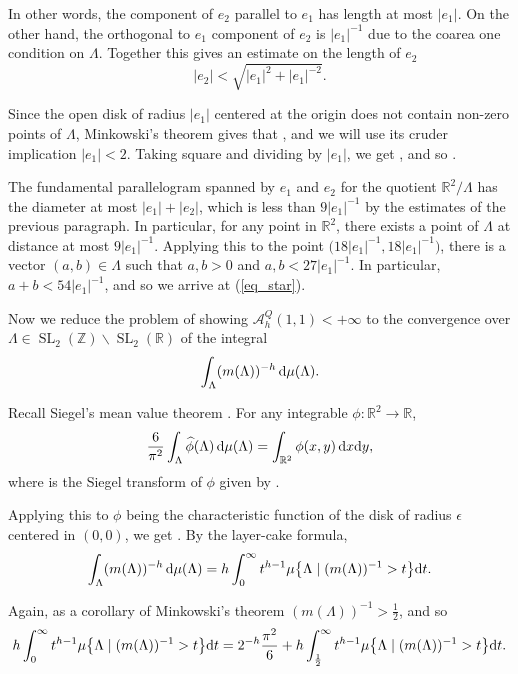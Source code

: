 \documentclass[10pt,a4paper]{amsart}
\numberwithin{equation}{section}
\theoremstyle{definition}
\begin{document}
In other words, the component of $e_2$ parallel to $e_1$ has length at most $|e_1|$. On the other hand, the orthogonal to $e_1$ component of $e_2$ is $|e_1|^{-1}$ due to the coarea one condition on $\Lambda$. Together this gives an estimate on the length of $e_2$
\[|e_2|<\sqrt{|e_1|^2+|e_1|^{-2}}.\]

Since the open disk of radius $|e_1|$ centered at the origin does not contain non-zero points of $\Lambda$, Minkowski's theorem \cite{minkowski} gives that , and we will use its cruder implication $|e_1|<2$. Taking square and dividing by $|e_1|$, we get , and so .

The fundamental parallelogram spanned by $e_1$ and $e_2$ for the quotient $\mathbb{R}^2\slash\Lambda$ has the diameter at most $|e_1|+|e_2|$, which is less than $9|e_1|^{-1}$ by the estimates of the previous paragraph. In particular, for any point in $\mathbb{R}^2$, there exists a point of $\Lambda$ at distance at most $9|e_1|^{-1}$. Applying this to the point $\bigl(18|e_1|^{-1},18|e_1|^{-1}\bigr)$, there is a vector $(a,b)\in\Lambda$ such that $a,b>0$ and $a,b<27|e_1|^{-1}$. In particular, $a+b<54|e_1|^{-1}$, and so we arrive at (\ref{eq_star}).

Now we reduce the problem of showing $\mathcal{A}^Q_h(1,1)<+\infty$ to the convergence over $\Lambda\in\operatorname{SL}_2(\mathbb{Z})\backslash\operatorname{SL}_2(\mathbb{R})$ of the integral \[\int_\Lambda (m(\Lambda))^{-h}\, {\rm d}\mu(\Lambda).\]

Recall Siegel's mean value theorem \cite{siegel}. For any integrable $\phi\colon\mathbb{R}^2\rightarrow\mathbb{R}$,
\[
\frac{6}{\pi^2}\int_\Lambda\widehat\phi(\Lambda)\, {\rm d}\mu(\Lambda)=\int_{\mathbb{R}^2}\phi(x,y)\, {\rm d}x{\rm d}y,
\]
where \smash{$\widehat\phi$} is the Siegel transform of $\phi$ given by .

Applying this to $\phi$ being the characteristic function of the disk of radius $\epsilon$ centered in $(0,0)$, we get . By the layer-cake formula,
\[
\int_\Lambda (m(\Lambda))^{-h}\,{\rm d}\mu(\Lambda)=h\int_{0}^\infty t^{h-1} \mu\bigl\{\Lambda\mid (m(\Lambda))^{-1}>t\bigr\} {\rm d}t.
\]

Again, as a corollary of Minkowski's theorem $(m(\Lambda))^{-1}>\frac{1}{2}$, and so
\[
h\int_{0}^\infty t^{h-1} \mu\bigl\{\Lambda\mid (m(\Lambda))^{-1}>t\bigr\} {\rm d}t=2^{-h}\frac{\pi^2}{6}+h\int_{\frac{1}{2}}^\infty t^{h-1} \mu\bigl\{\Lambda\mid (m(\Lambda))^{-1}>t\bigr\} {\rm d}t.
\]
\end{document}
